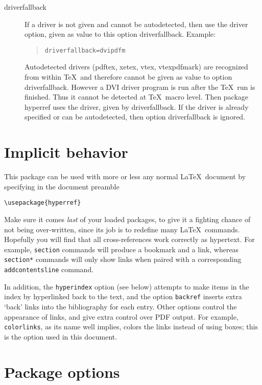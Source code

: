 \documentclass[pdftex]{article}
\newcommand*{\xpackage}[1]{\textsf{#1}}
\newcommand{\bs}{\symbol{'134}}%
\newcommand{\ci}[1]{\texttt{\bs#1}}
\begin{document}
\begin{description}
\item[driverfallback]
  If a driver is not given and cannot be autodetected, then use
  the driver option, given as value to this option \textsf{driverfallback}.
  Example:
  \begin{quote}
    \texttt{driverfallback=dvipdfm}
  \end{quote}
  Autodetected drivers (\textsf{pdftex}, \textsf{xetex}, \textsf{vtex},
  \textsf{vtexpdfmark}) are recognized from within \TeX\ and
  therefore cannot be given as value to option \textsf{driverfallback}.
  However a DVI driver program is run after the \TeX\ run is finished.
  Thus it cannot be detected at \TeX\ macro level. Then package
  \xpackage{hyperref}
  uses the driver, given by \textsf{driverfallback}. If the driver
  is already specified or can be autodetected, then option
  \textsf{driverfallback} is ignored.
\end{description}

\section{Implicit behavior}

This package can be used with more or less any normal \LaTeX\ document
by specifying in the document preamble

\begin{verbatim}
\usepackage{hyperref}
\end{verbatim}

Make sure it comes \emph{last} of your loaded packages, to give it a
fighting chance of not being over-written, since its job is to redefine
many \LaTeX\ commands. Hopefully you will find that all cross-references
work correctly as hypertext. For example, \ci{section} commands will
produce a bookmark and a link, whereas \ci{section*} commands will only
show links when paired with a corresponding \ci{addcontentsline}
command.

In addition, the \texttt{hyperindex} option (see below) attempts to make
items in the index by hyperlinked back to the text, and the option
\texttt{backref} inserts extra `back' links into the bibliography for
each entry. Other options control the appearance of links, and give
extra control over PDF output. For example, \texttt{colorlinks}, as its
name well implies, colors the links instead of using boxes; this is the
option used in this document.


\section{Package options}
\end{document}
